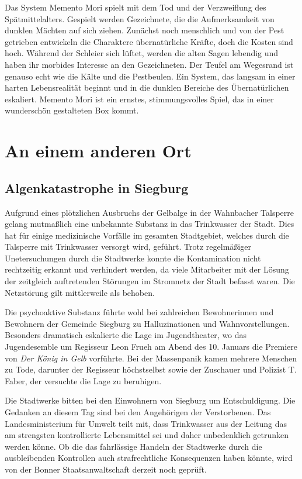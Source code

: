 \documentclass[final]{multiversum}
\begin{document}
Das System Memento Mori spielt mit dem Tod und der Verzweiflung des Spätmittelalters.
Gespielt werden Gezeichnete, die die Aufmerksamkeit von dunklen Mächten auf sich ziehen.
Zunächst noch menschlich und von der Pest getrieben entwickeln die Charaktere übernatürliche Kräfte, doch die Kosten sind hoch.
Während der Schleier sich lüftet, werden die alten Sagen lebendig und haben ihr morbides Interesse an den Gezeichneten.
Der Teufel am Wegesrand ist genauso echt wie die Kälte und die Pestbeulen.
Ein System, das langsam in einer harten Lebensrealität beginnt und in die dunklen Bereiche des Übernatürlichen eskaliert.
Memento Mori ist ein ernstes, stimmungsvolles Spiel, das in einer wunderschön gestalteten Box kommt.

\section{An einem anderen Ort}

\subsection{Algenkatastrophe in Siegburg}

Aufgrund eines plötzlichen Ausbruchs der Gelbalge in der Wahnbacher Talsperre gelang mutmaßlich eine unbekannte Substanz in das Trinkwasser der Stadt. Dies hat für einige medizinische Vorfälle im gesamten Stadtgebiet, welches durch die Talsperre mit Trinkwasser versorgt wird, geführt. Trotz regelmäßiger Unetersuchungen durch die Stadtwerke konnte die Kontamination nicht rechtzeitig erkannt und verhindert werden, da viele Mitarbeiter mit der Lösung der zeitgleich auftretenden Störungen im Stromnetz der Stadt befasst waren. Die Netzstörung gilt mittlerweile als behoben. 

Die psychoaktive Substanz führte wohl bei zahlreichen Bewohnerinnen und Bewohnern der Gemeinde Siegburg zu Halluzinationen und Wahnvorstellungen. Besonders dramatisch eskalierte die Lage im Jugendtheater, wo das Jugendesemble um Regisseur Leon Frueh am Abend des 10. Januars die Premiere von \textit{Der König in Gelb} vorführte. Bei der Massenpanik kamen mehrere Menschen zu Tode, darunter der Regisseur höchstselbst sowie der Zuschauer und Polizist T. Faber, der versuchte die Lage zu beruhigen.

Die Stadtwerke bitten bei den Einwohnern von Siegburg um Entschuldigung. Die Gedanken an diesem Tag sind bei den Angehörigen der Verstorbenen. Das Landesministerium für Umwelt teilt mit, dass Trinkwasser aus der Leitung das am strengsten kontrollierte Lebensmittel sei und daher unbedenklich getrunken werden könne. Ob die das fahrlässige Handeln der Stadtwerke durch die ausbleibenden Kontrollen auch strafrechtliche Konsequenzen haben könnte, wird von der Bonner Staatsanwaltschaft derzeit noch geprüft. 
\end{document}
